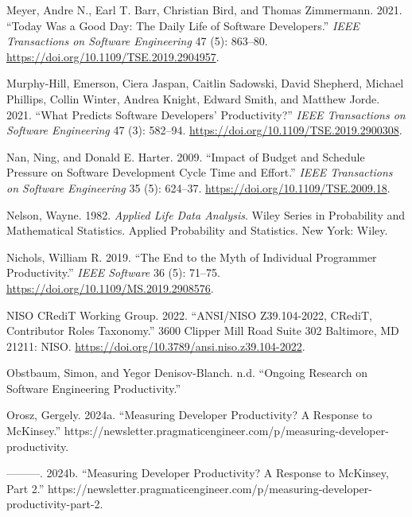\documentclass[
]{article}
\newlength{\cslhangindent}
\newenvironment{CSLReferences}[2] %
 {\begin{list}{}{%
  \setlength{\itemindent}{0pt}
  \setlength{\leftmargin}{0pt}
  \setlength{\parsep}{0pt}
  \ifodd #1
   \setlength{\leftmargin}{\cslhangindent}
   \setlength{\itemindent}{-1\cslhangindent}
  \fi
  \setlength{\itemsep}{#2\baselineskip}}}
 {\end{list}}
\begin{document}
\begin{CSLReferences}{1}{0}
Meyer, Andre N., Earl T. Barr, Christian Bird, and Thomas Zimmermann.
2021. {``Today {Was} a {Good Day}: {The Daily Life} of {Software
Developers}.''} \emph{IEEE Transactions on Software Engineering} 47 (5):
863--80. \url{https://doi.org/10.1109/TSE.2019.2904957}.

Murphy-Hill, Emerson, Ciera Jaspan, Caitlin Sadowski, David Shepherd,
Michael Phillips, Collin Winter, Andrea Knight, Edward Smith, and
Matthew Jorde. 2021. {``What {Predicts Software Developers}'
{Productivity}?''} \emph{IEEE Transactions on Software Engineering} 47
(3): 582--94. \url{https://doi.org/10.1109/TSE.2019.2900308}.

Nan, Ning, and Donald E. Harter. 2009. {``Impact of {Budget} and
{Schedule Pressure} on {Software Development Cycle Time} and
{Effort}.''} \emph{IEEE Transactions on Software Engineering} 35 (5):
624--37. \url{https://doi.org/10.1109/TSE.2009.18}.

Nelson, Wayne. 1982. \emph{Applied Life Data Analysis}. Wiley Series in
Probability and Mathematical Statistics. {Applied} Probability and
Statistics. New York: Wiley.

Nichols, William R. 2019. {``The {End} to the {Myth} of {Individual
Programmer Productivity}.''} \emph{IEEE Software} 36 (5): 71--75.
\url{https://doi.org/10.1109/MS.2019.2908576}.

NISO CRediT Working Group. 2022. {``{ANSI}/{NISO Z39}.104-2022,
{CRediT}, {Contributor Roles Taxonomy}.''} 3600 Clipper Mill Road Suite
302 Baltimore, MD 21211: NISO.
\url{https://doi.org/10.3789/ansi.niso.z39.104-2022}.

Obstbaum, Simon, and Yegor Denisov-Blanch. n.d. {``Ongoing {Research} on
{Software Engineering Productivity}.''}

Orosz, Gergely. 2024a. {``Measuring Developer Productivity? {A} Response
to {McKinsey}.''}
https://newsletter.pragmaticengineer.com/p/measuring-developer-productivity.

---------. 2024b. {``Measuring Developer Productivity? {A} Response to
{McKinsey}, {Part} 2.''}
https://newsletter.pragmaticengineer.com/p/measuring-developer-productivity-part-2.


\end{CSLReferences}
\end{document}
